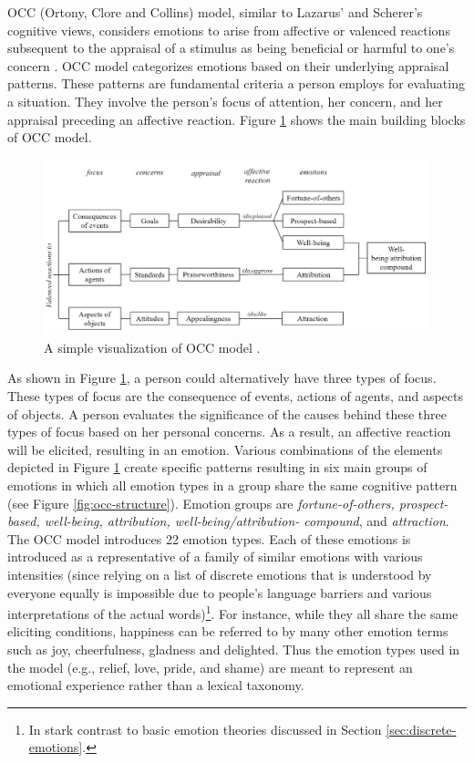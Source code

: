 \documentclass[12pt]{report}
\begin{document}
OCC (Ortony, Clore and Collins) model, similar to Lazarus'
\cite{lazarus:cognitive-theory-emotion} and Scherer's
\cite{scherer:nature-function-emotion} cognitive views, considers emotions to
arise from affective or valenced reactions subsequent to the appraisal of a
stimulus as being beneficial or harmful to one's concern \cite{occ:structure}.
OCC model categorizes emotions based on their underlying appraisal patterns.
These patterns are fundamental criteria a person employs for evaluating a
situation. They involve the person's focus of attention, her concern, and
her appraisal preceding an affective reaction. Figure \ref{fig:occ-model} shows
the main building blocks of OCC model.

\begin{figure}[tbh]
  \center
  \includegraphics[width=\textwidth]{figure/occ.png}
  \caption{A simple visualization of OCC model \cite{occ:structure}.}
  \label{fig:occ-model}
\end{figure}

As shown in Figure \ref{fig:occ-model}, a person could alternatively have three
types of focus. These types of focus are the consequence of events, actions of
agents, and aspects of objects. A person evaluates the significance of the
causes behind these three types of focus based on her personal concerns. As a
result, an affective reaction will be elicited, resulting in an emotion. Various
combinations of the elements depicted in Figure \ref{fig:occ-model} create
specific patterns resulting in six main groups of emotions in which all emotion
types in a group share the same cognitive pattern (see Figure
\ref{fig:occ-structure}). Emotion groups are \textit{fortune-of-others,
prospect-based, well-being, attribution, well-being/attribution- compound}, and
\textit{attraction}. The OCC model introduces 22 emotion types. Each of these
emotions is introduced as a representative of a family of similar emotions
with various intensities (since relying on a list of discrete emotions that is
understood by everyone equally is impossible due to people's language barriers
and various interpretations of the actual words)\footnote{In stark contrast to
basic emotion theories discussed in Section \ref{sec:discrete-emotions}.}. For
instance,  while they all share the same eliciting conditions, happiness can be
referred to by many other emotion terms such as joy, cheerfulness, gladness and
delighted. Thus the emotion types used in the model (e.g., relief, love, pride,
and shame) are meant to represent an emotional experience rather than a lexical
taxonomy.
\end{document}
